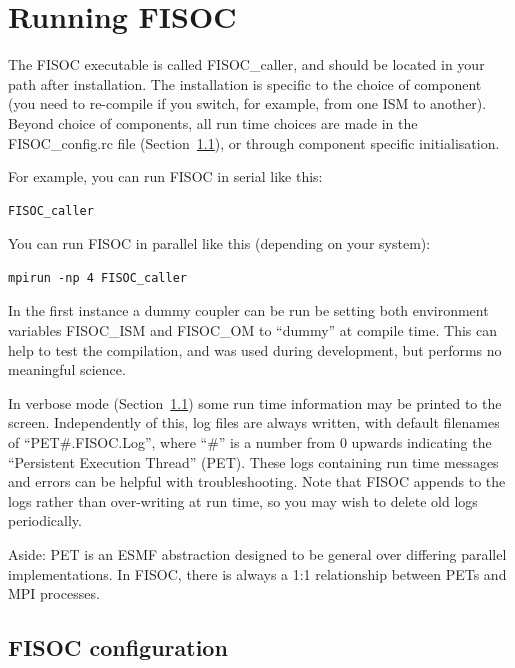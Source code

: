 \documentclass[12pt]{article}
\begin{document}







\section{Running FISOC}
\label{sec:FISOC_SUG}

The FISOC executable is called FISOC\_caller, and should be located in your path after installation. 
The installation is specific to the choice of component (you need to re-compile if you switch, for 
example, from one ISM to another).  
Beyond choice of components, all run time choices are made in the FISOC\_config.rc file
(Section~\ref{sec:config}), 
or through component specific initialisation.

For example, you can run FISOC in serial like this:
\begin{lstlisting}
FISOC_caller
\end{lstlisting}
You can run FISOC in parallel like this (depending on your system):
\begin{lstlisting}
mpirun -np 4 FISOC_caller
\end{lstlisting}

In the first instance a dummy coupler can be run be setting both environment variables FISOC\_ISM and 
FISOC\_OM to ``dummy'' at compile time.  This can help to test the compilation, and was used during development, 
but performs no meaningful science.  

In verbose mode (Section~\ref{sec:config}) some run time information may be printed to the screen.  
Independently of this, log files are always written, 
with default filenames of ``PET\#.FISOC.Log'', where ``\#'' is a number from 0 upwards indicating the 
``Persistent Execution Thread'' (PET). 
These logs containing run time messages and errors can be helpful with troubleshooting.
Note that FISOC appends to the logs rather than over-writing at run time, so you may wish to delete old logs 
periodically. 

Aside: PET is an ESMF abstraction designed to be general over differing parallel implementations. 
In FISOC, there is always a 1:1 relationship between PETs and MPI processes. 


\subsection{FISOC configuration}
\label{sec:config}
\end{document}
